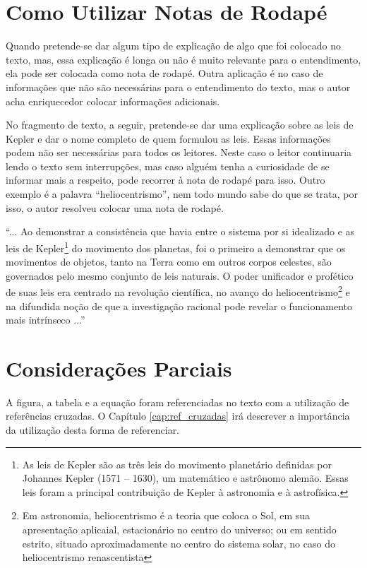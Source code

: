 \documentclass[
        oneside,      %
        english,			
        brazil			 
        ]{configcefetmglpd}
\begin{document}
\section{Como Utilizar Notas de Rodapé}
Quando pretende-se dar algum tipo de explicação de algo que foi colocado no texto, mas, essa explicação é longa ou não é muito relevante para o entendimento, ela pode ser colocada como nota de rodapé. Outra aplicação é no caso de informações que não são necessárias para o entendimento do texto, mas o autor acha enriquecedor colocar informações adicionais.

No fragmento de texto, a seguir, pretende-se dar uma explicação sobre as leis de Kepler e dar o nome completo de quem formulou as leis. Essas informações podem não ser necessárias para todos os leitores. Neste caso o leitor continuaria lendo o texto sem interrupções, mas caso alguém tenha a curiosidade de se informar mais a respeito, pode recorrer à nota de rodapé para isso. Outro exemplo é a palavra “heliocentrismo”, nem todo mundo sabe do que se trata, por isso, o autor resolveu colocar uma nota de rodapé.

“... Ao demonstrar a consistência que havia entre o sistema por si idealizado e as leis de Kepler\footnote{As leis de Kepler são as três leis do movimento planetário definidas por Johannes Kepler (1571 – 1630), um matemático e astrônomo alemão. Essas leis foram a principal contribuição de Kepler à astronomia e à astrofísica.}  do movimento dos planetas, foi o primeiro a demonstrar que os movimentos de objetos, tanto na Terra como em outros corpos celestes, são governados pelo mesmo conjunto de leis naturais. O poder unificador e profético de suas leis era centrado na revolução científica, no avanço do heliocentrismo\footnote{Em astronomia, heliocentrismo é a teoria que coloca o Sol, em sua apresentação aplicaial, estacionário no centro do universo; ou em sentido estrito, situado aproximadamente no centro do sistema solar, no caso do heliocentrismo renascentista}  e na difundida noção de que a investigação racional pode revelar o funcionamento mais intrínseco ...” %

\section{Considerações Parciais}
A figura, a tabela e a equação foram referenciadas no texto com a utilização de referências cruzadas. O Capítulo \ref{cap:ref_cruzadas} irá descrever a importância da utilização desta forma de referenciar.
\end{document}
